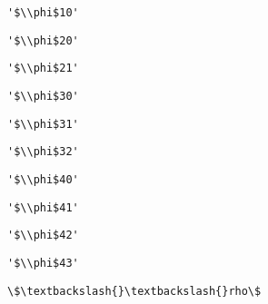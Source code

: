 \documentclass[11pt]{article}
\begin{document}
    
    \begin{verbatim}
'$\\phi$10'
    \end{verbatim}

    
    
    \begin{verbatim}
'$\\phi$20'
    \end{verbatim}

    
    
    \begin{verbatim}
'$\\phi$21'
    \end{verbatim}

    
    
    \begin{verbatim}
'$\\phi$30'
    \end{verbatim}

    
    
    \begin{verbatim}
'$\\phi$31'
    \end{verbatim}

    
    
    \begin{verbatim}
'$\\phi$32'
    \end{verbatim}

    
    
    \begin{verbatim}
'$\\phi$40'
    \end{verbatim}

    
    
    \begin{verbatim}
'$\\phi$41'
    \end{verbatim}

    
    
    \begin{verbatim}
'$\\phi$42'
    \end{verbatim}

    
    
    \begin{verbatim}
'$\\phi$43'
    \end{verbatim}

    
    \begin{Verbatim}[commandchars=\\\{\}]
\$\textbackslash{}\textbackslash{}rho\$

    \end{Verbatim}
\end{document}
